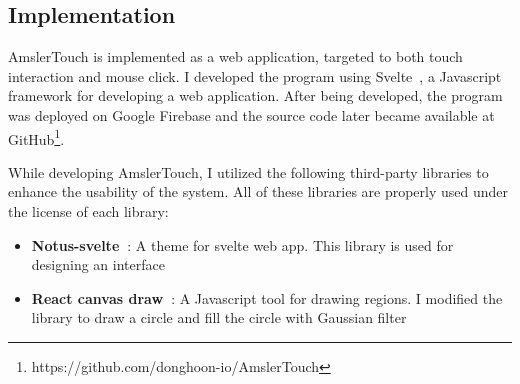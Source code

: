 \subsection{Implementation}

AmslerTouch is implemented as a web application, targeted to both touch interaction and mouse click. I developed the program using Svelte~\cite{svelte}, a Javascript framework for developing a web application. After being developed, the program was deployed on Google Firebase and the source code later became available at GitHub\footnote{https://github.com/donghoon-io/AmslerTouch}.

While developing AmslerTouch, I utilized the following third-party libraries to enhance the usability of the system. All of these libraries are properly used under the license of each library:

\begin{itemize}
    \item \textbf{Notus-svelte~\cite{notus-svelte}}: A theme for svelte web app. This library is used for designing an interface
    \item \textbf{React canvas draw~\cite{react-canvas-draw}}: A Javascript tool for drawing regions. I modified the library to draw a circle and fill the circle with Gaussian filter
\end{itemize}